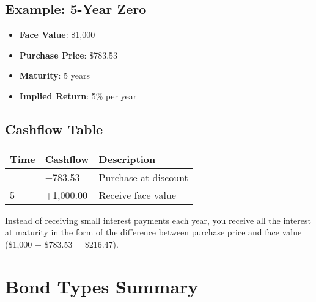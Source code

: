 \documentclass[
  letterpaper,
]{scrbook}
\providecommand{\tightlist}{%
  \setlength{\itemsep}{0pt}\setlength{\parskip}{0pt}}
\begin{document}
\subsection{Example: 5-Year Zero}\label{example-5-year-zero}

\begin{itemize}
\tightlist
\item
  \textbf{Face Value}: \$1,000
\item
  \textbf{Purchase Price}: \$783.53
\item
  \textbf{Maturity}: 5 years
\item
  \textbf{Implied Return}: 5\% per year
\end{itemize}

\subsection{Cashflow Table}\label{cashflow-table-1}

\begin{longtable}[]{@{}lll@{}}
\toprule\noalign{}
Time & Cashflow & Description \\
\midrule\noalign{}
\endhead
\bottomrule\noalign{}
\endlastfoot
0 & −783.53 & Purchase at discount \\
5 & +1,000.00 & Receive face value \\
\end{longtable}

\FloatBarrier

\begin{tcolorbox}[enhanced jigsaw, toptitle=1mm, colbacktitle=quarto-callout-tip-color!10!white, opacityback=0, leftrule=.75mm, breakable, colframe=quarto-callout-tip-color-frame, toprule=.15mm, opacitybacktitle=0.6, coltitle=black, bottomrule=.15mm, colback=white, arc=.35mm, titlerule=0mm, rightrule=.15mm, left=2mm, title=\textcolor{quarto-callout-tip-color}{\faLightbulb}\hspace{0.5em}{Intuition: All Interest at Once}, bottomtitle=1mm]

Instead of receiving small interest payments each year, you receive all
the interest at maturity in the form of the difference between purchase
price and face value (\$1,000 − \$783.53 = \$216.47).

\end{tcolorbox}

\section{Bond Types Summary}\label{bond-types-summary}
\end{document}
